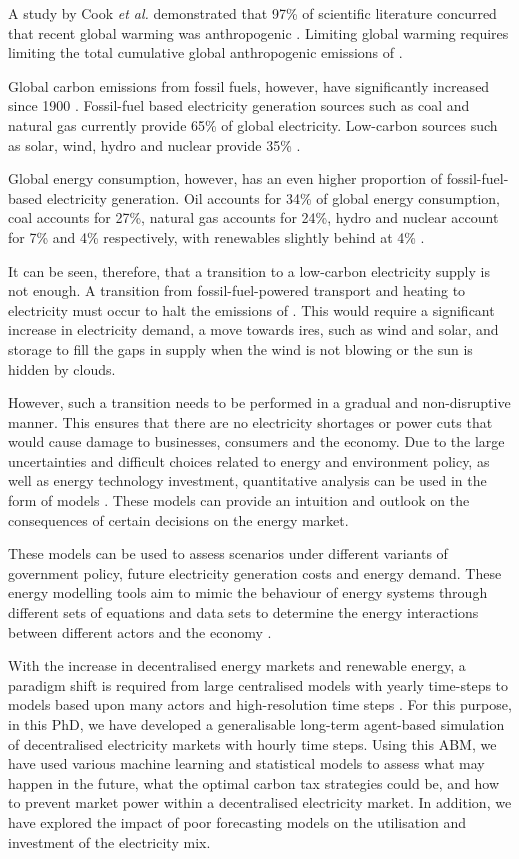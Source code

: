 A study by Cook \textit{et al.} demonstrated that 97\% of scientific literature concurred that recent global warming was anthropogenic \cite{Cook2013}. Limiting global warming requires limiting the total cumulative global anthropogenic emissions of  \cite{Masson-Delmotte2018}. 

Global carbon emissions from fossil fuels, however, have significantly increased since 1900 \cite{boden2017global}.    Fossil-fuel based electricity generation sources such as coal and natural gas currently provide 65\% of global electricity. Low-carbon sources such as solar, wind, hydro and nuclear provide 35\% \cite{BP2018}. 

Global energy consumption, however, has an even higher proportion of fossil-fuel-based electricity generation. Oil accounts for 34\% of global energy consumption, coal accounts for 27\%, natural gas accounts for 24\%, hydro and nuclear account for 7\% and 4\% respectively, with renewables slightly behind at 4\% \cite{BPReview}. 

It can be seen, therefore, that a transition to a low-carbon electricity supply is not enough. A transition from fossil-fuel-powered transport and heating to electricity must occur to halt the emissions of . This would require a significant increase in electricity demand, a move towards \gls{ires}, such as wind and solar, and storage to fill the gaps in supply when the wind is not blowing or the sun is hidden by clouds. 

However, such a transition needs to be performed in a gradual and non-disruptive manner. This ensures that there are no electricity shortages or power cuts that would cause damage to businesses, consumers and the economy. Due to the large uncertainties and difficult choices related to energy and environment policy, as well as energy technology investment, quantitative analysis can be used in the form of models \cite{DeCarolis2012}. These models can provide an intuition and outlook on the consequences of certain decisions on the energy market.

These models can be used to assess scenarios under different variants of government policy, future electricity generation costs and energy demand. These energy modelling tools aim to mimic the behaviour of energy systems through different sets of equations and data sets to determine the energy interactions between different actors and the economy \cite{Machado2019}.

With the increase in decentralised energy markets and renewable energy, a paradigm shift is required from large centralised models with yearly time-steps to models based upon many actors and high-resolution time steps \cite{Ringkjob2018, Pfenninger2014b}. For this purpose, in this PhD, we have developed a generalisable long-term agent-based simulation of decentralised electricity markets with hourly time steps. Using this \gls{ABM}, we have used various machine learning and statistical models to assess what may happen in the future, what the optimal carbon tax strategies could be, and how to prevent market power within a decentralised electricity market. In addition, we have explored the impact of poor forecasting models on the utilisation and investment of the electricity mix. 

